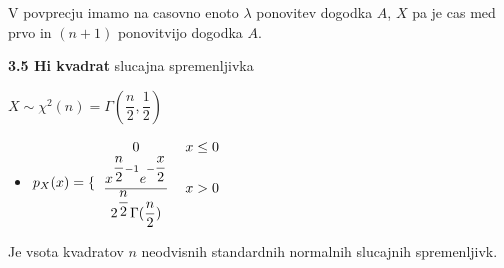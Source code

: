 \documentclass{article}
\begin{document}
\begin{multicols}{3}
	V povprecju imamo na casovno enoto $\lambda$ ponovitev dogodka $A$, $X$ pa je cas med
	prvo in $(n + 1)$ ponovitvijo dogodka $A$.

	\textbf{3.5 Hi kvadrat} slucajna spremenljivka
	\begin{center}
		\begin{math}
			X \sim  \chi^{2}(n) = \Gamma(\dfrac{n}{2}, \dfrac{1}{2})
		\end{math}
	\end{center}

	\begin{itemize}
		\item  \begin{math}
			      p_{X}(x) =
			      \{\begin{tabular}{ccc}
				      $0$                                                                                       & $x \leq 0$ & \\
				      $\dfrac{x^{\dfrac{n}{2} - 1} e ^{- \dfrac{x}{2}}}{2^{\dfrac{n}{2}} \Gamma(\dfrac{n}{2})}$ & $x > 0$    & \\
			      \end{tabular}
		      \end{math}
	\end{itemize}

	Je vsota kvadratov $n$ neodvisnih standardnih normalnih slucajnih spremenljivk.

	\smallskip
\end{multicols}
\end{document}
